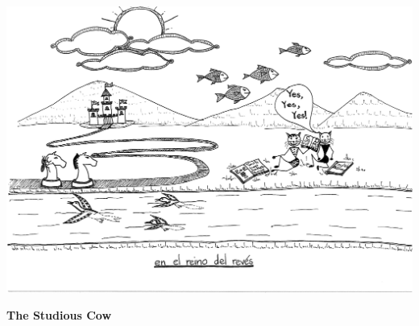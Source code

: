 \documentclass[11pt,a4paper]{article}
\begin{document}
\bigskip
\centerline{\includegraphics[page=2,scale=0.7,clip=true,trim = 0in 3mm 0in 0in]{20150406235752619.pdf}}
\begin{center}\large\textbf{The Studious Cow}\end{center}
\end{document}
